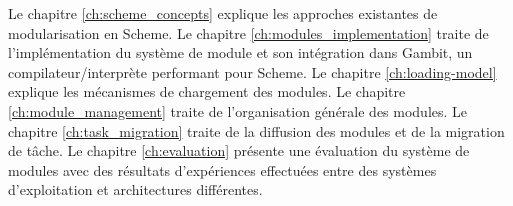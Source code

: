 Le chapitre \ref{ch:scheme_concepts} explique les approches existantes de
modularisation en Scheme.  Le chapitre \ref{ch:modules_implementation}
traite de l'implémentation du système de module et son intégration dans Gambit,
un compilateur/interprète performant pour Scheme. Le chapitre
\ref{ch:loading-model} explique les mécanismes de chargement des modules.  Le
chapitre \ref{ch:module_management} traite de l'organisation générale des
modules. Le chapitre \ref{ch:task_migration} traite de la diffusion des modules
et de la migration de tâche.  Le chapitre \ref{ch:evaluation} présente une
évaluation du système de modules avec des résultats d'expériences effectuées
entre des systèmes d'exploitation et architectures différentes.












